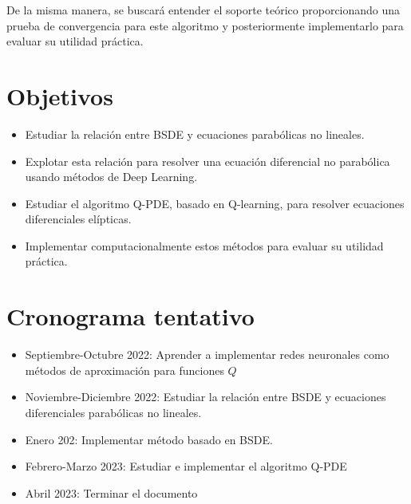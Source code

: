 \documentclass[a4paper,11pt]{scrartcl}
\begin{document}
	De la misma manera, se buscará entender el soporte teórico proporcionando una prueba de convergencia para este algoritmo y posteriormente implementarlo para evaluar su utilidad práctica.
	\section{Objetivos}
	\begin{itemize}
		\item Estudiar la relación entre BSDE y ecuaciones parabólicas no lineales.
		\item Explotar esta relación para resolver una ecuación diferencial no parabólica usando métodos de Deep Learning.
		\item Estudiar el algoritmo Q-PDE, basado en Q-learning, para resolver ecuaciones diferenciales elípticas.
		\item Implementar computacionalmente estos métodos para evaluar su utilidad práctica. 
	\end{itemize}
	\section{Cronograma tentativo}
	\begin{itemize}
		\item Septiembre-Octubre 2022: Aprender a implementar redes neuronales como métodos de aproximación para funciones $Q$
		\item Noviembre-Diciembre 2022: Estudiar la relación entre BSDE y ecuaciones diferenciales parabólicas no lineales.
		\item Enero 202: Implementar método basado en BSDE.
		\item Febrero-Marzo 2023: Estudiar e implementar el algoritmo Q-PDE 
		\item Abril 2023: Terminar el documento
	\end{itemize}
	\nocite{*}
	
	
	
\end{document}

